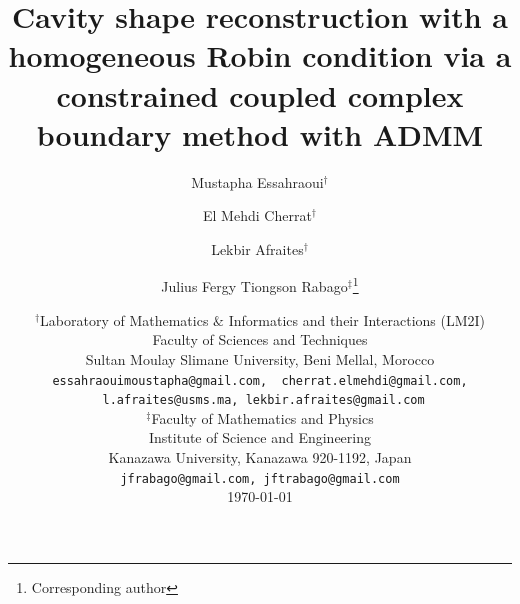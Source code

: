 \documentclass[a4paper,11pt]{article}
\newcommand{\alert}[1]{{\color{black}{#1}}}
\begin{document}
\title{Cavity shape reconstruction with a homogeneous Robin condition via a constrained coupled complex boundary method with ADMM}
\author{Mustapha Essahraoui$^{\dagger}$   \and  El Mehdi Cherrat$^{\dagger}$ \and Lekbir Afraites$^{\dagger}$ \and Julius Fergy Tiongson Rabago$^{\ddagger}$\thanks{Corresponding author}}
\date{%
	{\footnotesize
        $^{\dagger}$Laboratory of Mathematics $\&$ Informatics and their Interactions (LM2I)\\%
        Faculty of Sciences and Techniques\\%
        Sultan Moulay Slimane University,
        Beni Mellal, Morocco\\\vspace{-2pt}
        \texttt{essahraouimoustapha@gmail.com, \ cherrat.elmehdi@gmail.com, \ l.afraites@usms.ma,\ lekbir.afraites@gmail.com}\\[2ex]
	$^{\ddagger}$Faculty of Mathematics and Physics\\%
	 Institute of Science and Engineering\\%
         Kanazawa University, Kanazawa 920-1192, Japan\\\vspace{-2pt}
        \texttt{jfrabago@gmail.com,\ jftrabago@gmail.com}}\\[2ex]        
    \today
}
\end{document}
